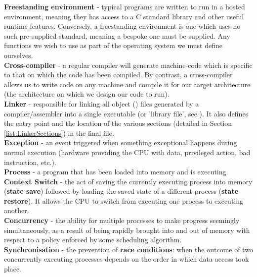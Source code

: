     \noindent \textbf{Freestanding environment} - typical programs are written
    to run in a hosted environment, meaning they has access to a C standard
    library and other useful runtime features. Conversely, a freestanding
    environment is one which uses no such pre-supplied standard, meaning a
    bespoke one must be supplied. Any functions we wish to use as part of the
    operating system we must define ourselves. \\

    \noindent \textbf{Cross-compiler} - a regular compiler will generate
    machine-code which is specific to that on which the code has been compiled.
    By contrast, a  cross-compiler allows us to write code on any machine and
    compile it for our target architecture (the architecture on which we design
    our code to run). \\

    \noindent \textbf{Linker} - responsible for linking all object ()
    files generated by a compiler/assembler into a single executable (or
    'library file', see \cite{StaticLibrary}). It also defines the entry point
    and the location of the various sections (detailed in Section
    \ref{list:LinkerSections}) in the final  file.\\

    \noindent \textbf{Exception} - an event triggered when something exceptional happens
    during normal execution (hardware providing the CPU with data, privileged
    action, bad instruction, etc.). \\

    \noindent \textbf{Process} - a program that has been loaded into memory and is
    executing. \\

    \noindent \textbf{Context Switch} - the act of saving the currently executing process
    into memory (\textbf{state save}) followed by loading the saved state of a
    different process (\textbf{state restore}). It allows the CPU to switch from
    executing one process to executing another. \\

    \noindent \textbf{Concurrency} - the ability for multiple processes to make
    progress seemingly simultaneously, as a result of being rapidly brought into
    and out of memory with respect to a policy enforced by some scheduling
    algorithm. \\

    \noindent \textbf{Synchronisation} - the prevention of \textbf{race
    conditions}: when the outcome of two concurrently executing processes
    depends on the order in which data access took place. \\

